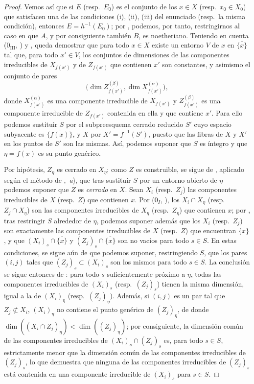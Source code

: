 \begin{proof}
Vemos así que si $E$ (resp.~$E_0$) es el conjunto de los $x\in X$ (resp.~$x_0\in X_0$) que satisfacen una de las condiciones (i), (ii), (iii) del enunciado (resp.~la misma condición), entonces $E=h^{-1}(E_0)$; por , podemos, por tanto, restringirnos al caso en que $A$, y por consiguiente también $B$, es noetheriano.
Teniendo en cuenta ($0_{\mathrm{III}}$, ) y , queda demostrar que para todo $x\in X$ existe un entorno $V$ de $x$ en $\overline{\{x\}}$ tal que, para todo $x'\in V$, los conjuntos de dimensiones de las componentes irreducibles de $X_{f(x')}$ y de $Z_{f(x')}$ que contienen $x'$ son constantes, y asimismo el conjunto de pares
\[
  \bigl(\dim Z_{f(x')}^{(\beta)},\dim X_{f(x')}^{(\alpha)}\bigr),
\]
donde $X_{f(x')}^{(\alpha)}$ es una componente irreducible de $X_{f(x')}$ y $Z_{f(x')}^{(\beta)}$ es una componente irreducible de $Z_{f(x')}$ contenida en ella y que contiene $x'$.
Para ello podemos sustituir $S$ por el subpreesquema cerrado reducido $S'$ cuyo espacio subyacente es $\overline{\{f(x)\}}$, y $X$ por $X'=f^{-1}(S')$, puesto que las fibras de $X$ y $X'$ en los puntos de $S'$ son las mismas.
Así, podemos suponer que $S$ es íntegro y que $\eta=f(x)$ es su punto genérico.

Por hipótesis, $Z_\eta$ es cerrado en $X_\eta$; como $Z$ es construible, se sigue de , aplicado según el método de ,~\emph{a}), que tras sustituir $S$ por un entorno abierto de $\eta$ podemos suponer que $Z$ es \emph{cerrado} en $X$.
Sean $X_i$ (resp.~$Z_j$) las componentes irreducibles de $X$ (resp.~$Z$) que contienen $x$.
Por ($0_I$, ), los $X_i\cap X_\eta$ (resp.~$Z_j\cap X_\eta$) son las componentes irreducibles de $X_\eta$ (resp.~$Z_\eta$) que contienen $x$; por , tras restringir $S$ alrededor de $\eta$, podemos suponer además que los $X_i$ (resp.~$Z_j$) son exactamente las componentes irreducibles de $X$ (resp.~$Z$) que encuentran $\overline{\{x\}}$, y que $(X_i)_s\cap\overline{\{x\}}$ y $(Z_j)_s\cap\overline{\{x\}}$ son no vacíos para todo $s\in S$.
En estas condiciones, se sigue aún de  que podemos suponer, restringiendo $S$, que los pares $(i,j)$ tales que $(Z_j)_s\subset(X_i)_s$ son los mismos para todo $s\in S$.
La conclusión se sigue entonces de : para todo $s$ suficientemente próximo a $\eta$, todas las componentes irreducibles de $(X_i)_s$ (resp.~$(Z_j)_s$) tienen la misma dimensión, igual a la de $(X_i)_\eta$ (resp.~$(Z_j)_\eta$).
Además, si $(i,j)$ es un par tal que $Z_j\not\subset X_i$, $(X_i)_\eta$ no contiene el
punto genérico de $(Z_j)_\eta$, de donde $\dim((X_i\cap Z_j)_\eta)<\dim((Z_j)_\eta)$; por consiguiente, la dimensión común de las componentes irreducibles de $(X_i)_s\cap(Z_j)_s$ es, para todo $s\in S$, estrictamente menor que la dimensión común de las componentes irreducibles de $(Z_j)_s$, lo que demuestra que ninguna de las componentes irreducibles de $(Z_j)_s$ está contenida en una componente irreducible de $(X_i)_s$ para $s\in S$.
\end{proof}

